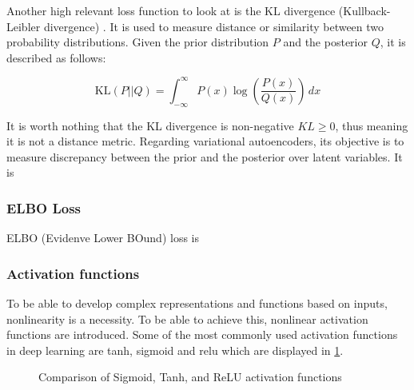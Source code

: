 Another high relevant loss function to look at is the KL divergence (Kullback-Leibler divergence)  \cite{shlens2014notes}. It is used to measure distance or similarity between two probability distributions. Given the prior distribution $P$ and the posterior $Q$, it is described as follows:

\begin{equation}
    \text{KL}(P||Q) = \int_{-\infty}^{\infty} P(x) \log \left( \frac{P(x)}{Q(x)} \right) \, dx
\end{equation}

It is worth nothing that the KL divergence is non-negative $KL \geq 0$, thus meaning it is not a distance metric.
Regarding variational autoencoders, its objective is to measure discrepancy between the prior and the posterior over latent variables. It is 

\subsubsection{ELBO Loss}

ELBO (Evidenve Lower BOund) loss is 

\subsubsection{Activation functions}

To be able to develop complex representations and functions based on inputs, nonlinearity is a necessity. To be able to achieve this, nonlinear activation functions are introduced. Some of the most commonly used activation functions in deep learning are tanh, sigmoid and \acrshort{relu} which are displayed in \ref{fig:actfuncs}.

\begin{figure}[h]
\centering
{}
\caption{Comparison of Sigmoid, Tanh, and ReLU activation functions}
\label{fig:actfuncs}
\end{figure}

